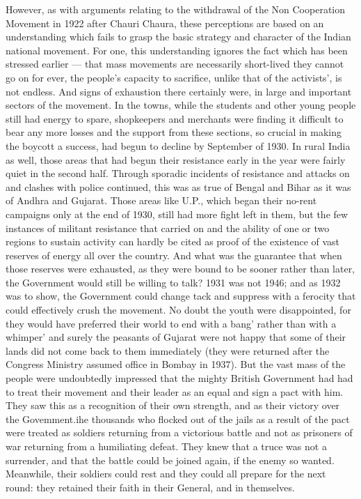 \begin{multicols}{2}
However, as with arguments relating to the withdrawal of the Non Cooperation Movement in 1922 after Chauri Chaura, these perceptions are based on an understanding which fails to grasp the basic strategy and character of the Indian national movement. For one, this understanding ignores the fact which has been stressed earlier --- that mass movements are necessarily short-lived they cannot go on for ever, the people's capacity to sacrifice, unlike that of the activists', is not endless. And signs of exhaustion there certainly were, in large and important sectors of the movement. In the towns, while the students and other young people still had energy to spare, shopkeepers and merchants were finding it difficult to bear any more losses and the support from these sections, so crucial in making the boycott a success, had begun to decline by September of 1930. In rural India as well, those areas that had begun their resistance early in the year were fairly quiet in the second half. Through sporadic incidents of resistance and attacks on and clashes with police continued, this was as true of Bengal and Bihar as it was of Andhra and Gujarat. Those areas like U.P., which began their no-rent campaigns only at the end of 1930, still had more fight left in them, but the few instances of militant resistance that carried on and the ability of one or two regions to sustain activity can hardly be cited as proof of the existence of vast reserves of energy all over the country. And what was the guarantee that when those reserves were exhausted, as they were bound to be sooner rather than later, the Government would still be willing to talk? 1931 was not 1946; and as 1932 was to show, the Government could change tack and suppress with a ferocity that could effectively crush the movement. No doubt the youth were disappointed, for they would have preferred their world to end with a bang' rather than with a whimper' and surely the peasants of Gujarat were not happy that some of their lands did not come back to them immediately (they were returned after the Congress Ministry assumed office in Bombay in 1937). But the vast mass of the people were undoubtedly impressed that the mighty British Government had had to treat their movement and their leader as an equal and sign a pact with him. They saw this as a recognition of their own strength, and as their victory over the Govemment.ihe thousands who flocked out of the jails as a result of the pact were treated as soldiers returning from a victorious battle and not as prisoners of war returning from a humiliating defeat. They knew that a truce was not a surrender, and that the battle could be joined again, if the enemy so wanted. Meanwhile, their soldiers could rest and they could all prepare for the next round: they retained their faith in their General, and in themselves.


\end{multicols}
